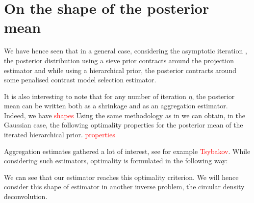 \section{On the shape of the posterior mean}\label{2.6}

We have hence seen that in a general case, considering the asymptotic iteration , the posterior distribution using a sieve prior contracts around the projection estimator and while using a hierarchical prior, the posterior contracts around some penalised contrast model selection estimator.

It is also interesting to note that for any number of iteration $\eta$, the posterior mean can be written both as a shrinkage and as an aggregation estimator.
Indeed, we have
\textcolor{red}{shapes}
Using the same methodology as in  we can obtain, in the Gaussian case, the following optimality properties for the posterior mean of the iterated hierarchical prior.
\textcolor{red}{properties}

\medskip

Aggregation estimates gathered a lot of interest, see for example \textcolor{red}{Tsybakov}.
While considering such estimators, optimality is formulated in the following way:

We can see that our estimator reaches this optimality criterion.
We will hence consider this shape of estimator in another inverse problem, the circular density deconvolution.